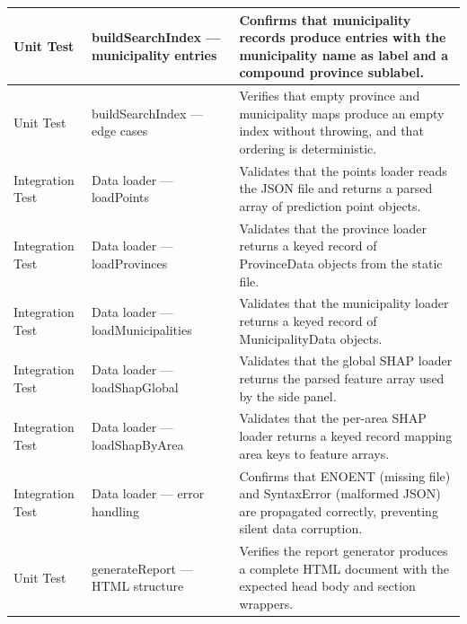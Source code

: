 \documentclass[12pt, letterpaper]{article}
\numberwithin{figure}{section}
\numberwithin{table}{section}
\begin{document}
\begin{center}
\begin{singlespace}
\begin{longtable}{|
        >{\raggedright\arraybackslash}p{}|
        >{\raggedright\arraybackslash}p{}|
      >{\raggedright\arraybackslash}p{}|}
      \rowcolor{white}
      Unit Test & buildSearchIndex — municipality entries & Confirms
      that municipality records produce entries with the municipality
      name as label and a compound province sublabel. \\ \hline

      \rowcolor{white}
      Unit Test & buildSearchIndex — edge cases & Verifies that empty
      province and municipality maps produce an empty index without
      throwing, and that ordering is deterministic. \\ \hline

      \rowcolor{white}
      Integration Test & Data loader — loadPoints & Validates that
      the points loader reads the JSON file and returns a parsed
      array of prediction point objects. \\ \hline

      \rowcolor{white}
      Integration Test & Data loader — loadProvinces & Validates that
      the province loader returns a keyed record of ProvinceData
      objects from the static file. \\ \hline

      \rowcolor{white}
      Integration Test & Data loader — loadMunicipalities & Validates
      that the municipality loader returns a keyed record of
      MunicipalityData objects. \\ \hline

      \rowcolor{white}
      Integration Test & Data loader — loadShapGlobal & Validates
      that the global SHAP loader returns the parsed feature array
      used by the side panel. \\ \hline

      \rowcolor{white}
      Integration Test & Data loader — loadShapByArea & Validates
      that the per-area SHAP loader returns a keyed record mapping
      area keys to feature arrays. \\ \hline

      \rowcolor{white}
      Integration Test & Data loader — error handling & Confirms that
      ENOENT (missing file) and SyntaxError (malformed JSON) are
      propagated correctly, preventing silent data corruption. \\ \hline

      \rowcolor{white}
      Unit Test & generateReport — HTML structure & Verifies the
      report generator produces a complete HTML document with the
      expected head body and section wrappers. \\ \hline


\end{longtable}
\end{singlespace}
\end{center}
\end{document}
